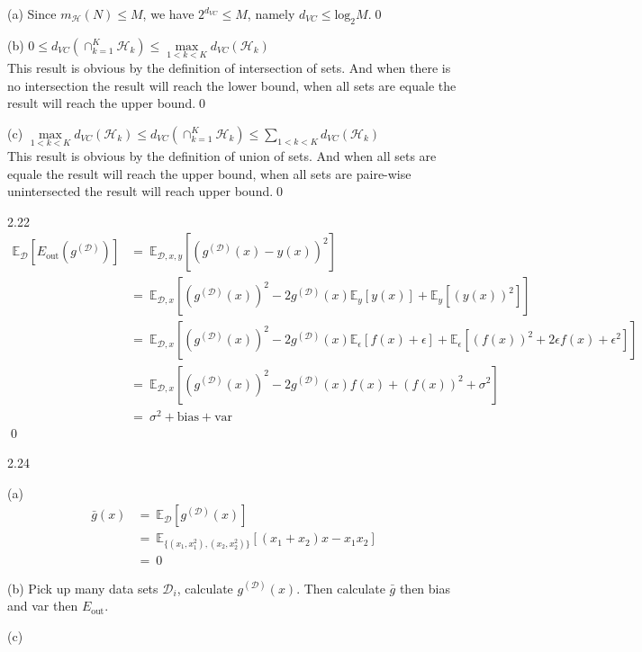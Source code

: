 \documentclass{article}
\def\mH{m_\mathcal{H}}
\begin{document}
\begin{tlist}{5}
\begin{tlist}{4}
		\item[(a)]
		Since $\mH(N)\leq M$, we have $2^{d_{VC}}\leq M$, namely $d_{VC}\leq \text{log}_2M$.\qed
		\item[(b)]
		$0 \leq d_{VC}(\cap_{k=1}^K \mathcal{H}_k) \leq \max\limits_{1<k<K}d_{VC}(\mathcal{H}_k)$\\
		This result is obvious by the definition of intersection of sets. And when there is no intersection the result will reach the lower bound, when all sets are equale the result will reach the upper bound.\qed
		\item[(c)]
		$\max\limits_{1<k<K}d_{VC}(\mathcal{H}_k) \leq d_{VC}(\cap_{k=1}^K \mathcal{H}_k) \leq \sum\limits_{1<k<K}d_{VC}(\mathcal{H}_k)$\\
		This result is obvious by the definition of union of sets. And when all sets are equale the result will reach the upper bound, when all sets are paire-wise unintersected the result will reach upper bound.\qed
	\end{tlist}
	\item[2.22]
	\def\E{\mathbb{E}}
	\def\D{\mathcal{D}}
	$$\begin{aligned}
			\E_\D[E_\text{out}(g^{(\D)})]
			 & =\ \E_{\D,x,y}[(g^{(\D)}(x)-y(x))^2]                                \\
			 & =\ \E_{\D,x}[(g^{(\D)}(x))^2-2g^{(\D)}(x)\E_y[y(x)]+\E_y[(y(x))^2]] \\
			 & =\ \E_{\D,x}[(g^{(\D)}(x))^2
			-2g^{(\D)}(x)\E_\epsilon[f(x)+\epsilon]
			+\E_\epsilon[(f(x))^2+2\epsilon f(x)+\epsilon^2]]                      \\
			 & =\ \E_{\D,x}[(g^{(\D)}(x))^2-2g^{(\D)}(x)f(x)+(f(x))^2+\sigma^2]    \\
			 & =\ \sigma^2+\text{bias}+\text{var}
		\end{aligned}$$
	\qed
	\item[2.24]
	\begin{tlist}{4}
		\item[(a)]
		$$\begin{aligned}
				\bar{g}(x)
				 & =\ \E_\D[g^{(\D)}(x)]                                  \\
				 & =\ \E_{\{(x_1,x_1^2),(x_2,x_2^2)\}}[(x_1+x_2)x-x_1x_2] \\
				 & =\ 0
			\end{aligned}$$
		\item[(b)]
		Pick up many data sets $\D_i$, calculate $g^{(\D)}(x)$. Then calculate $\bar{g}$ then bias and var then $E_\text{out}$.
		\item[(c)]

\end{tlist}
\end{tlist}
\end{document}
